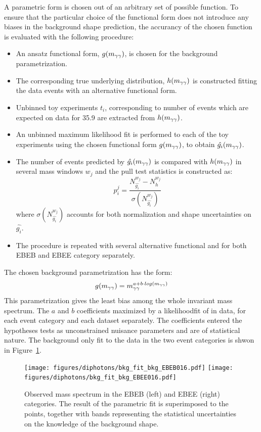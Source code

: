 A parametric form is chosen out of an arbitrary set of possible function.
To ensure that the particular choice of the functional form does not introduce any biases in the
background shape prediction, the accurancy of the chosen function is evaluated with the following
procedure:

\begin{itemize}
      \item An ansatz functional form, $g(m_{\gamma\gamma})$, is chosen for the background
        parametrization.
      \item The corresponding true underlying distribution, $h(m_{\gamma\gamma})$ is constructed fitting the
        data events with an alternative functional form.
      \item Unbinned toy experiments $t_{i}$, corresponding to number of events which are expected on data for 35.9 \fbinv
        are extracted from $h(m_{\gamma\gamma})$.
      \item An unbinned maximum likelihood fit is performed to each of the toy experiments using the chosen
        functional form $g(m_{\gamma\gamma})$, to obtain $\hat{g_{i}}(m_{\gamma\gamma})$.
      \item The number of events predicted by $\hat{g_{i}}(m_{\gamma\gamma})$ is compared with $h(m_{\gamma\gamma})$
        in several mass windows $w_{j}$ and the pull test statistics is constructed as:
        $$ p^{j}_{i} = \frac{ N^{w_j}_{\hat{g_i}} - N^{w_j}_{h} } { \sigma(N^{w_j}_{\hat{g_i}}) } $$
        where $\sigma(N^{w_j}_{\hat{g_i}})$ accounts for both normalization and shape
        uncertainties on $\hat{g_i}$.
      \item The procedure is repeated with several alternative functional and for both EBEB and EBEE category separately.
\end{itemize}

The chosen background parametrization has the form:
\begin{equation}
  g(m_{\gamma\gamma}) = m_{\gamma\gamma}^{a+b \cdot log(m_{\gamma\gamma})}
\end{equation}
\label{eq:bkg_dijet}
This parametrization gives the least bias among the whole invariant mass spectrum.
The $a$ and $b$ coefficients maximized by a likelihoodfit of \mgg in data, for each event category and each dataset separately. The coefficients entered the hypotheses tests as unconstrained nuisance parameters and are of statistical
nature.
The background only fit to the data in the two event categories is shwon in Figure~\ref{fig:bkg_fits}.

\begin{figure}
  \centering
  \texttt{[image: figures/diphotons/bkg\_fit\_bkg\_EBEB016.pdf]}
  \texttt{[image: figures/diphotons/bkg\_fit\_bkg\_EBEE016.pdf]}  
  \caption{Observed mass spectrum in the EBEB (left) and EBEE (right) categories. The result of the parametric fit is
    superimposed to the points, together with bands representing the statistical uncertainties on
    the knowledge of the background shape.}
  \label{fig:bkg_fits}
\end{figure}

